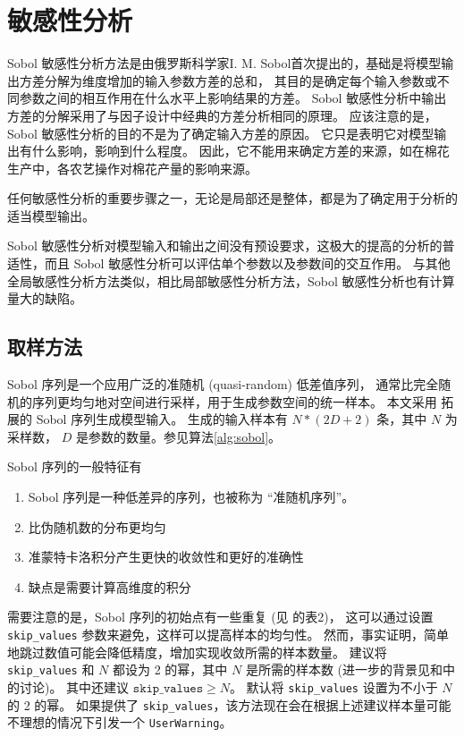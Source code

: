 \section{敏感性分析}
Sobol 敏感性分析方法是由俄罗斯科学家I. M. Sobol首次提出的\cite{sobol2001}，基础是将模型输出方差分解为维度增加的输入参数方差的总和，
其目的是确定每个输入参数或不同参数之间的相互作用在什么水平上影响结果的方差。%
Sobol 敏感性分析中输出方差的分解采用了与因子设计中经典的方差分析相同的原理。%
应该注意的是，Sobol 敏感性分析的目的不是为了确定输入方差的原因。%
它只是表明它对模型输出有什么影响，影响到什么程度。%
因此，它不能用来确定方差的来源，如在棉花生产中，各农艺操作对棉花产量的影响来源。

任何敏感性分析的重要步骤之一，无论是局部还是整体，都是为了确定用于分析的适当模型输出。

Sobol 敏感性分析对模型输入和输出之间没有预设要求，这极大的提高的分析的普适性，而且 Sobol 敏感性分析可以评估单个参数以及参数间的交互作用。%
与其他全局敏感性分析方法类似，相比局部敏感性分析方法，Sobol 敏感性分析也有计算量大的缺陷。

\subsection{取样方法}
Sobol 序列是一个应用广泛的准随机 (quasi-random) 低差值序列，%
通常比完全随机的序列更均匀地对空间进行采样，用于生成参数空间的统一样本。%
本文采用  拓展的 Sobol 序列生成模型输入。%
生成的输入样本有 $N * (2D + 2)$ 条，其中 $N$ 为采样数， $D$ 是参数的数量。参见算法\ref{alg:sobol}。

Sobol 序列的一般特征有
\begin{enumerate}
    \item Sobol 序列是一种低差异的序列，也被称为 “准随机序列”。
    \item 比伪随机数的分布更均匀
    \item 准蒙特卡洛积分产生更快的收敛性和更好的准确性
    \item 缺点是需要计算高维度的积分
\end{enumerate}

需要注意的是，Sobol 序列的初始点有一些重复 (见 的表2)，%
这可以通过设置 \texttt{skip\_values} 参数来避免，这样可以提高样本的均匀性。%
然而，事实证明，简单地跳过数值可能会降低精度，增加实现收敛所需的样本数量\cite{owen2021}。
建议将 \texttt{skip\_values} 和 $N$ 都设为 2 的幂，其中 $N$ 是所需的样本数 (进一步的背景见和中的讨论)。%
其中还建议 $\mathtt{skip\_values} \ge N$。%
默认将 \texttt{skip\_values} 设置为不小于 $N$ 的 2 的幂。%
如果提供了 \texttt{skip\_values}，该方法现在会在根据上述建议样本量可能不理想的情况下引发一个 \texttt{UserWarning}。

